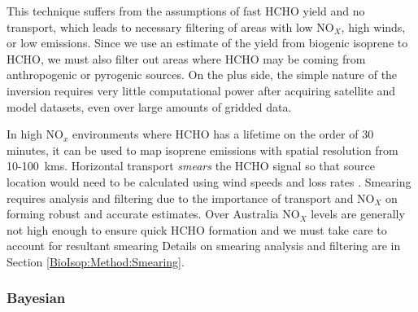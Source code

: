       This technique suffers from the assumptions of fast HCHO yield and no transport, which leads to necessary filtering of areas with low NO$_X$, high winds, or low emissions.
      Since we use an estimate of the yield from biogenic isoprene to HCHO, we must also filter out areas where HCHO may be coming from anthropogenic or pyrogenic sources.
      On the plus side, the simple nature of the inversion requires very little computational power after acquiring satellite and model datasets, even over large amounts of gridded data.
      
      In high NO$_x$ environments where HCHO has a lifetime on the order of 30 minutes, it can be used to map isoprene emissions with spatial resolution from 10-100~kms.
      Horizontal transport \textit{smears} the HCHO signal so that source location would need to be calculated using wind speeds and loss rates \parencite{Palmer2001,Palmer2003}.
      Smearing requires analysis and filtering due to the importance of transport and NO$_X$ on forming robust and accurate estimates.
      Over Australia NO$_X$ levels are generally not high enough to ensure quick HCHO formation and we must take care to account for resultant smearing
      Details on smearing analysis and filtering are in Section \ref{BioIsop:Method:Smearing}.
      
    
    \subsubsection{Bayesian}
      
